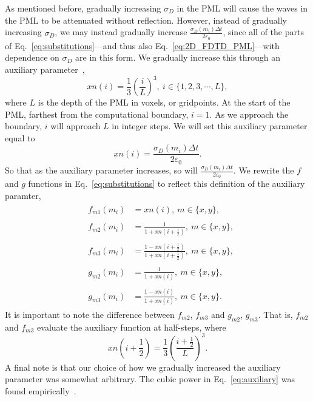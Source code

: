 \documentclass[12pt,twocolumn]{article}
\begin{document}
As mentioned before, gradually increasing $\sigma_D$ in the PML will cause the waves in the PML to be attenuated without reflection. However, instead of gradually increasing $\sigma_D$, we may instead gradually increase $\frac{\sigma_D(m_i)\Delta t}{2\varepsilon_0}$, since all of the parts of Eq.~\ref{eq:substitutions}---and thus also Eq.~\ref{eq:2D_FDTD_PML}---with dependence on $\sigma_D$ are in this form. We gradually increase this through an auxiliary parameter~\cite{Sullivan00},
\begin{equation}
xn(i)=\frac{1}{3}\left(\frac{i}{L}\right)^3,~i\in\{1,2,3,\cdots,L\},
\end{equation}
where $L$ is the depth of the PML in voxels, or gridpoints. At the start of the PML, farthest from the computational boundary, $i=1$. As we approach the boundary, $i$ will approach $L$ in integer steps. We will set this auxiliary parameter equal to
\begin{equation}
\label{eq:auxiliary}
xn(i) = \frac{\sigma_D(m_i)\Delta t}{2\varepsilon_0}.
\end{equation}
So that as the auxiliary parameter increases, so will $\frac{\sigma_D(m_i)\Delta t}{2\varepsilon_0}$. We rewrite the $f$ and $g$ functions in Eq.~\ref{eq:substitutions} to reflect this definition of the auxiliary paramter,
\begin{subequations}
\begin{align}
&\begin{aligned}
f_{m1}(m_i) &= xn(i),~m\in\{x,y\},
\end{aligned}\\
&\begin{aligned}
f_{m2}(m_i) &= \frac{1}{1+xn\left(i+\frac{1}{2}\right)},~m\in\{x,y\},
\end{aligned}\\
&\begin{aligned}
f_{m3}(m_i) &= \frac{1-xn\left(i+\frac{1}{2}\right)}{1+xn\left(i+\frac{1}{2}\right)},~m\in\{x,y\},
\end{aligned}\\
&\begin{aligned}
g_{m2}(m_i) &= \frac{1}{1+xn\left(i\right)},~m\in\{x,y\},
\end{aligned}\\
&\begin{aligned}
g_{m3}(m_i) &= \frac{1-xn(i)}{1+xn(i)},~m\in\{x,y\}.
\end{aligned}
\end{align}
\end{subequations}
It is important to note the difference between $f_{m2}$, $f_{m3}$ and $g_{m2}$, $g_{m3}$. That is, $f_{m2}$ and $f_{m3}$ evaluate the auxiliary function at half-steps, where
\begin{equation}
xn(i+\frac{1}{2}) = \frac{1}{3}\left(\frac{i+\frac{1}{2}}{L}\right)^3.
\end{equation}
A final note is that our choice of how we gradually increased the auxiliary parameter was somewhat arbitrary. The cubic power in Eq.~\ref{eq:auxiliary} was found empirically~\cite{Sullivan00}.
\end{document}
